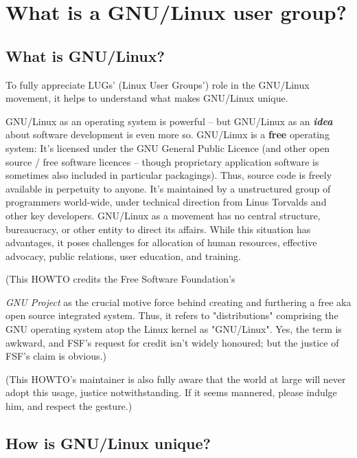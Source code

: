 \section{What is a GNU/Linux user group?}

\subsection{What is GNU/Linux?}

To fully appreciate LUGs' (Linux User Groups') role in the GNU/Linux 
movement, it helps to understand what makes GNU/Linux unique.

GNU/Linux as an operating system is powerful -- but GNU/Linux as an
{\itshape {\bfseries idea}\/} about software development is even more so. GNU/Linux
is a {\bfseries free} operating system: It's licensed under the GNU General
Public Licence (and other open source / free software licences -- though 
proprietary application software is sometimes also included in
particular packagings). Thus, source code is freely available in
perpetuity to anyone. It's maintained by a unstructured group of
programmers world-wide, under technical direction from Linus Torvalds
and other key developers. GNU/Linux as a movement has no central
structure, bureaucracy, or other entity to direct its affairs. While
this situation has advantages, it poses challenges for allocation of
human resources, effective advocacy, public relations, user education,
and training.



(This HOWTO credits the Free Software Foundation's 

\emph{GNU Project} \texttt{\abrurl}
 as the crucial motive force behind creating and furthering a free 
aka open source integrated system.  Thus, it refers to "distributions" 
comprising the GNU operating system atop the Linux kernel as "GNU/Linux".
Yes, the term is awkward, and FSF's request for credit isn't widely 
honoured; but the justice of FSF's claim is obvious.)

(This HOWTO's maintainer is also fully aware that the world at large
will never adopt this usage, justice notwithstanding.  If it seems 
mannered, please indulge him, and respect the gesture.)






\subsection{How is GNU/Linux unique?}

